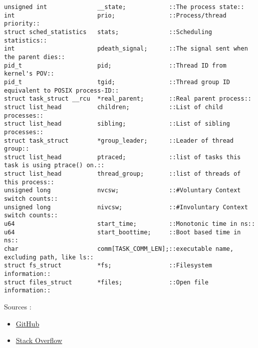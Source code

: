 \documentclass[16pt]{amsart}           %
\begin{document}
\begin{enumerate}
    \begin{verbatim}
unsigned int              __state;            ::The process state::
int                       prio;               ::Process/thread priority::
struct sched_statistics   stats;              ::Scheduling statistics::
int                       pdeath_signal;      ::The signal sent when the parent dies::
pid_t                     pid;                ::Thread ID from kernel's POV::
pid_t                     tgid;               ::Thread group ID equivalent to POSIX process-ID::
struct task_struct __rcu  *real_parent;       ::Real parent process::
struct list_head          children;           ::List of child processes::
struct list_head          sibling;            ::List of sibling processes::
struct task_struct        *group_leader;      ::Leader of thread group::
struct list_head          ptraced;            ::list of tasks this task is using ptrace() on.::
struct list_head          thread_group;       ::list of threads of this process::
unsigned long             nvcsw;              ::#Voluntary Context switch counts::
unsigned long             nivcsw;             ::#Involuntary Context switch counts::
u64                       start_time;         ::Monotonic time in ns::
u64                       start_boottime;     ::Boot based time in ns::
char                      comm[TASK_COMM_LEN];::executable name, excluding path, like ls::
struct fs_struct          *fs;                ::Filesystem information::
struct files_struct       *files;             ::Open file information::
\end{verbatim}

        Sources : \begin{itemize}
            \item \href{https://github.com/torvalds/linux/blob/master/include/linux/sched.h}{GitHub}
            \item \href{https://stackoverflow.com/questions/9305992/if-threads-share-the-same-pid-how-can-they-be-identified}{Stack Overflow}
        \end{itemize}
    \end{enumerate}
\end{document}
